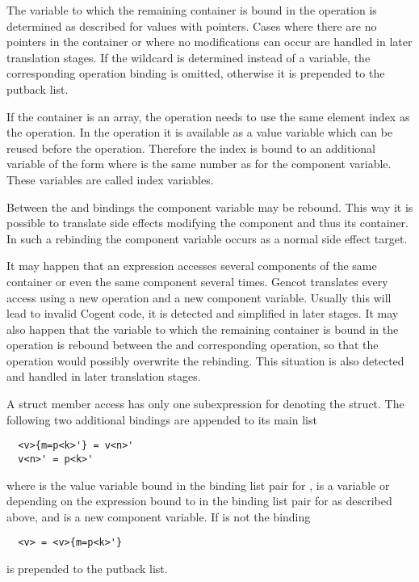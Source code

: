 The variable to which the remaining container is bound in the  operation is determined as described for values 
with pointers. Cases where there are no pointers in the container or where no modifications can occur are handled in later
translation stages. If the wildcard \code{\_} is determined instead of a variable, the corresponding  operation
binding is omitted, otherwise it is prepended to the putback list.

If the container is an array, the  operation needs to use the same element index as the  operation. 
In the  operation it is available as a value variable which can be reused before the  operation. 
Therefore the index is bound to an additional variable of the form  where  is the same number as for 
the component variable. These variables are called index variables.

Between the  and  bindings the component variable may be rebound. This way it is possible to translate
side effects modifying the component and thus its container. In such a rebinding the component variable occurs as a normal side
effect target.

It may happen that an expression accesses several components of the same container or even the same component several times.
Gencot translates every access using a new  operation and a new component variable. Usually this will lead to 
invalid Cogent code, it is detected and simplified in later stages. It may also happen that the variable to which the remaining 
container is bound in the  operation is rebound between the  and corresponding  operation,
so that the  operation would possibly overwrite the rebinding. This situation is also detected and handled in 
later translation stages.

A struct member access  has only one subexpression  for denoting the struct. The following two additional 
bindings are appended to its main list
\begin{verbatim}
  <v>{m=p<k>'} = v<n>'
  v<n>' = p<k>'
\end{verbatim}
where  is the value variable bound in the binding list pair for ,  is a variable or \code{\_} 
depending on the expression bound to  in the binding list pair for  as described above, and  
is a new component variable. If  is not \code{\_} the binding
\begin{verbatim}
  <v> = <v>{m=p<k>'}
\end{verbatim}
is prepended to the putback list.

